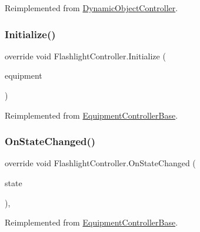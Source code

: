 Reimplemented from \mbox{\hyperlink{class_dynamic_object_controller_ac82dd85f0560a3ba17e50cc1254fbca3}{Dynamic\+Object\+Controller}}.

\mbox{\label{class_flashlight_controller_a3bc506518b599e1f8af7dfacb2180b35}} 
\subsubsection{\texorpdfstring{Initialize()}{Initialize()}}
{\footnotesize\ttfamily override void Flashlight\+Controller.\+Initialize (\begin{DoxyParamCaption}\item[{\mbox{\hyperlink{class_equipment}{Equipment}}}]{equipment }\end{DoxyParamCaption})\hspace{0.3cm}{\ttfamily [virtual]}}



Reimplemented from \mbox{\hyperlink{class_equipment_controller_base_a2bd9dfc6d920c98460436504145ebe6f}{Equipment\+Controller\+Base}}.

\mbox{\label{class_flashlight_controller_a80535a2da68630caac6deddcce5d388e}} 
\subsubsection{\texorpdfstring{On\+State\+Changed()}{OnStateChanged()}}
{\footnotesize\ttfamily override void Flashlight\+Controller.\+On\+State\+Changed (\begin{DoxyParamCaption}\item[{\mbox{\hyperlink{class_equipment_a8b3877398e5be5b420818b99ad7f0bca}{Equipment.\+Equipment\+State}}}]{state }\end{DoxyParamCaption})\hspace{0.3cm}{\ttfamily [protected]}, {\ttfamily [virtual]}}



Reimplemented from \mbox{\hyperlink{class_equipment_controller_base_a324ae128d6b938e23a6d1c4a33c370c4}{Equipment\+Controller\+Base}}.


